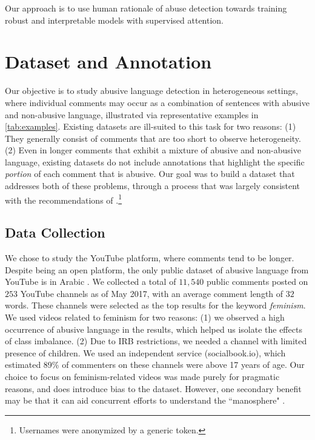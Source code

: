 \documentclass[letterpaper]{article}
\begin{document}
Our approach is to use  human rationale of abuse detection towards training robust and interpretable models with supervised attention.


\section{Dataset and Annotation}
\label{sec:dataset}

Our objective is to study abusive language detection in heterogeneous settings, where  individual comments may occur as a combination of sentences with abusive and non-abusive language, illustrated via representative examples in \ref{tab:examples}.
Existing datasets are ill-suited to this task for two reasons: (1) They generally consist of comments that are too short to observe heterogeneity.
(2) Even in longer comments that exhibit a mixture of abusive and non-abusive language, existing datasets do not include annotations that highlight the specific \textit{portion} of each comment that is abusive.
Our goal was to build a dataset that addresses  both of these problems, through a process that was largely consistent with the recommendations of \cite{vidgen2019challenges}.\footnote{Usernames were anonymized by a generic token.}


\subsection{Data Collection}
We chose to study the YouTube platform, where comments tend to be longer.
Despite being an open platform, the  only public dataset of abusive language from YouTube is in Arabic \cite{alakrot2018dataset}.
We collected a total of $11,540$ public comments posted on $253$ YouTube channels as of May 2017,
with an average comment length of $32$ words.
These channels were selected as the top results for the keyword \textit{feminism}.
We used videos related to feminism  for two reasons:
(1) we observed a high occurrence of abusive language in the results, which helped us isolate the effects of class imbalance.
(2) Due to IRB restrictions, we needed a channel with limited presence of children. We used an independent service (socialbook.io), which estimated 89\% of commenters on these channels were above 17 years of age.
Our choice to focus on feminism-related videos was made purely for pragmatic reasons, and does introduce bias to the dataset.
However, one secondary benefit may be that it can aid concurrent efforts to understand the ``manosphere" \cite{ribeiroevolution}.
\end{document}

